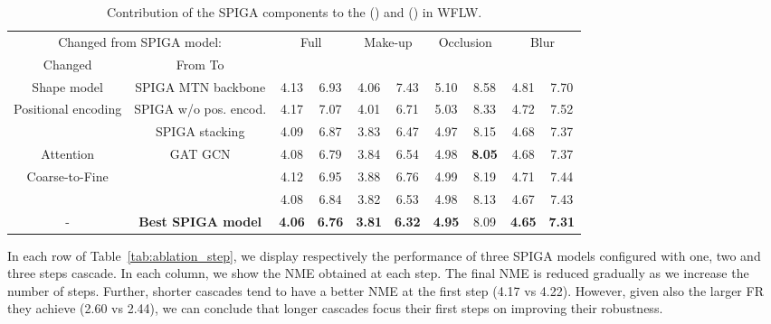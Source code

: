 \documentclass{bmvc2k}
\newcommand{\first}[1]{{\color{blue} \textbf{#1}}}
\newcommand{\second}[1]{{\color{green} #1}}
\newcommand{\third}[1]{{\color{red} #1}}
\begin{document}
\begin{table*}
\scriptsize
\begin{center}
\setlength\tabcolsep{2pt}
\begin{tabular}{c|c|cc|cc|cc|cc}
\hline 
\multicolumn{2}{c|}{Changed from SPIGA model:} & \multicolumn{2}{c}{Full} & \multicolumn{2}{c}{Make-up}  & \multicolumn{2}{c}{Occlusion} & \multicolumn{2}{c}{Blur}  \\
Changed       & From  To   &  &  &  &  &  &  &  &  \\
\hline
Shape model & SPIGA  MTN backbone 
& 4.13 & 6.93  & 4.06 & 7.43 & 5.10 & 8.58 & 4.81 & 7.70  \\
\hline
\multirow{2}{*}{Positional encoding} & SPIGA  w/o pos. encod. & 4.17 & 7.07  & 4.01 & 6.71 & 5.03 & 8.33 & 4.72 & 7.52 \\
 & SPIGA  stacking & 4.09 & 6.87  & \third{3.83} & \second{6.47} & \second{4.97} & 8.15 & \third{4.68} & \second{7.37} \\
\hline
Attention & GAT  GCN & \second{4.08} & \second{6.79}  & 3.84 & 6.54 & \third{4.98} & \first{8.05} & \third{4.68} & \second{7.37} \\
\hline
\multirow{2}{*}{Coarse-to-Fine} &    & 4.12 & 6.95  & 3.88 & 6.76 & 4.99 & 8.19 & 4.71 & 7.44  \\
 &    & \second{4.08} & \third{6.84}  & \second{3.82} & \third{6.53} & \third{4.98} & \third{8.13} & \second{4.67} & 7.43  \\
\hline
- & \textbf{Best SPIGA model}  & \first{4.06} & \first{6.76}  & \first{3.81} & \first{6.32} & \first{4.95} & \second{8.09} & \first{4.65} & \first{7.31}  \\
\hline
\end{tabular}
\end{center}
\caption{
Contribution of the SPIGA components to the () and () in WFLW.} 
\label{tab:ablation_wflw_npe90}
\end{table*}


In each row of Table~\ref{tab:ablation_step}, we display respectively the performance of three SPIGA models configured with one, two and three steps cascade. In each column, we show the NME obtained at each step. The final NME is reduced gradually as we increase the number of steps. Further, shorter cascades tend to have a better NME at the first step (4.17 vs 4.22). However, given also the larger FR they achieve (2.60 vs 2.44), we can conclude that longer cascades focus their first steps on improving their robustness.
\end{document}
